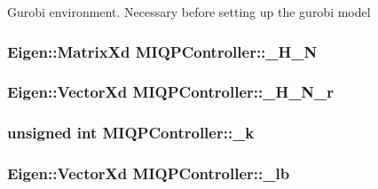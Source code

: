 \-Gurobi environment. \-Necessary before setting up the gurobi model \hypertarget{classMIQPController_ab4b99d844add54fa7ad6ca6b80cab089}{
\subsubsection[{\-\_\-\-H\-\_\-\-N}]{\setlength{\rightskip}{0pt plus 5cm}\-Eigen\-::\-Matrix\-Xd {\bf \-M\-I\-Q\-P\-Controller\-::\-\_\-\-H\-\_\-\-N}}}\label{classMIQPController_ab4b99d844add54fa7ad6ca6b80cab089}
\hypertarget{classMIQPController_a03c53b7f316d43dfe1aa60eba628819c}{
\subsubsection[{\-\_\-\-H\-\_\-\-N\-\_\-r}]{\setlength{\rightskip}{0pt plus 5cm}\-Eigen\-::\-Vector\-Xd {\bf \-M\-I\-Q\-P\-Controller\-::\-\_\-\-H\-\_\-\-N\-\_\-r}}}\label{classMIQPController_a03c53b7f316d43dfe1aa60eba628819c}
\hypertarget{classMIQPController_af60e2d5a786f4af4fa445dea6ba1b625}{
\subsubsection[{\-\_\-k}]{\setlength{\rightskip}{0pt plus 5cm}unsigned int {\bf \-M\-I\-Q\-P\-Controller\-::\-\_\-k}}}\label{classMIQPController_af60e2d5a786f4af4fa445dea6ba1b625}
\hypertarget{classMIQPController_ad3544c00f3515146c1818440905e36cc}{
\subsubsection[{\-\_\-lb}]{\setlength{\rightskip}{0pt plus 5cm}\-Eigen\-::\-Vector\-Xd {\bf \-M\-I\-Q\-P\-Controller\-::\-\_\-lb}}}\label{classMIQPController_ad3544c00f3515146c1818440905e36cc}
